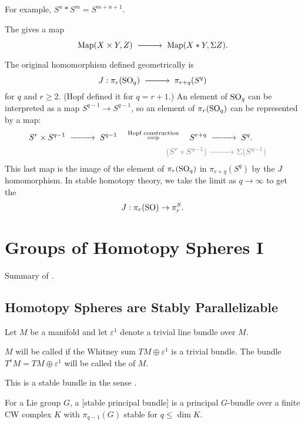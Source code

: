 For example, $S^n * S^m = S^{m+n+1}$.

\begin{definition}
	The  gives a map
	\[
		\Map(X\times Y, Z) \lkxto \Map(X * Y, \Sigma Z).
	\]
\end{definition}

The original homomorphism defined geometrically is
\[
		J : \pi_r(\SO_q) \lkxto \pi_{r+q}(S^q)
\]
for $q$ and $r\geq 2$. (Hopf defined it for $q=r+1$.) An element of $\operatorname{SO}_q$ can be interpreted as a map $S^{q-1} \to S^{q-1}$, so an element of $\pi_r(\operatorname{SO}_q)$ can be represented by a map:
\[
	\begin{aligned}
	S^r \times S^{q-1} \lkxto S^{q-1} \quad\overset{\textrm{Hopf construction}}{\implies}\quad 
	 S^{r+q} &\lkxto S^q.\phantom{(S^{q-1})}\\
	 \textcolor{gray}{(S^r * S^{q-1})} &\textcolor{gray}{\lkxto} \textcolor{gray}{\Sigma (S^{q-1})}
\end{aligned}
\]
This last map is the image of the element of $\pi_r(\operatorname{SO}_q)$ in $\pi_{r+q}(S^q)$ by the $J$ homomorphism. In stable homotopy theory, we take the limit as $q\to \infty$ to get the 
\[
		J : \pi_r(\operatorname{SO}) \to \pi_r^S.
\]

\chapter{Groups of Homotopy Spheres I}

Summary of \cite{milnor1963groups}.

\section{Homotopy Spheres are Stably Parallelizable}

Let $M$ be a manifold and let $\varepsilon^1$ denote a trivial line bundle over $M$.

\begin{definition}
	$M$ will be called  if the Whitney sum $TM \oplus \varepsilon^1$ is  a trivial bundle. The bundle $T^sM = TM\oplus\varepsilon^1$ will be called the  of $M$.
\end{definition}

This is a stable bundle in the sense \cite{kervaire1959}.
\begin{definition}
	For a Lie group $G$, a [stable principal bundle] is a principal $G$-bundle over a finite CW complex $K$ with $\pi_{q-1}(G)$ stable for $q \leq \dim K$.
\end{definition}

